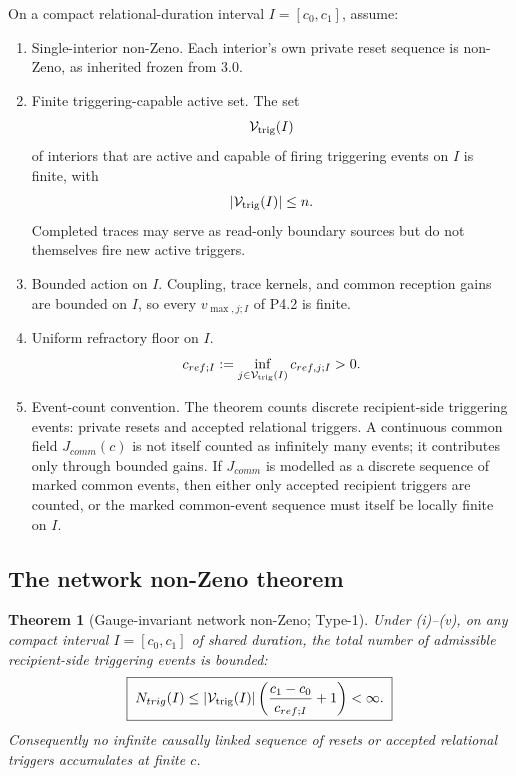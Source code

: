 \documentclass[11pt,a4paper]{article}
\def\mathfrak#1{#1}%
\def\mathrm#1{#1}%
\def\emph#1{#1}%
\theoremstyle{definition}
\theoremstyle{plain}
\newtheorem{theorem}[definition]{Theorem}
\theoremstyle{remark}
\begin{document}
On a compact relational-duration interval \(I=[\mathfrak c_0,\mathfrak c_1]\),
assume:
\begin{enumerate}[label=\textup{(\roman*)},leftmargin=1.2cm]
\item \emph{Single-interior non-Zeno.} Each interior's own private reset sequence is
non-Zeno, as inherited frozen from 3.0.
\item \emph{Finite triggering-capable active set.} The set
\[
\mathcal V_{\rm trig}(I)
\]
of interiors that are active and capable of firing triggering events on \(I\) is
finite, with
\[
|\mathcal V_{\rm trig}(I)|\le n.
\]
Completed traces may serve as read-only boundary sources but do not themselves
fire new active triggers.
\item \emph{Bounded action on \(I\).} Coupling, trace kernels, and common reception
gains are bounded on \(I\), so every \(v_{\max,j;I}\) of P4.2 is finite.
\item \emph{Uniform refractory floor on \(I\).}
\[
\mathfrak c_{\mathrm{ref};I}
:=
\inf_{j\in\mathcal V_{\rm trig}(I)}
\mathfrak c_{\mathrm{ref},j;I}
>0.
\]
\item \emph{Event-count convention.} The theorem counts discrete recipient-side
triggering events: private resets and accepted relational triggers. A continuous
common field \(J_{\mathrm{comm}}(\mathfrak c)\) is not itself counted as infinitely
many events; it contributes only through bounded gains. If \(J_{\mathrm{comm}}\) is
modelled as a discrete sequence of marked common events, then either only accepted
recipient triggers are counted, or the marked common-event sequence must itself be
locally finite on \(I\).
\end{enumerate}

\subsection{The network non-Zeno theorem}

\begin{theorem}[Gauge-invariant network non-Zeno; Type-1]\label{thm:nonzeno}
Under \textup{(i)--(v)}, on any compact interval
\(I=[\mathfrak c_0,\mathfrak c_1]\) of shared duration, the total number of
admissible recipient-side triggering events is bounded:
\[
\boxed{\;
N_{\mathrm{trig}}(I)
\le
|\mathcal V_{\rm trig}(I)|
\left(
\frac{\mathfrak c_1-\mathfrak c_0}{\mathfrak c_{\mathrm{ref};I}}+1
\right)
<\infty.
\;}
\]
Consequently no infinite causally linked sequence of resets or accepted relational
triggers accumulates at finite \(\mathfrak c\).
\end{theorem}
\end{document}
